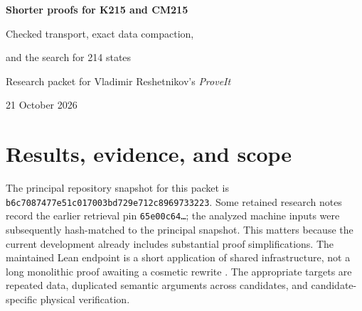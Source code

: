 \documentclass[11pt]{article}
\newcommand{\pin}{\texttt{b6c7087477e51c017003bd729e712c8969733223}}
\begin{document}
\begin{center}
{\LARGE\bfseries Shorter proofs for K215 and CM215}\par
\vspace{5pt}
{\large Checked transport, exact data compaction,\par and the search for 214 states}\par
\vspace{10pt}
Research packet for Vladimir Reshetnikov's \emph{ProveIt}\par
21 October 2026
\end{center}

\begin{abstract}
The most useful next simplification is to prove nearby machines correct by a local halting-equivalence theorem, reusing the calibrated K215 endpoint. For the existing conditional-marker alternative CM215, this packet supplies a history-free invariant, a reusable positive-stuttering theorem checked in both Lean and Coq, and an exact-table Lean proof of all-tape equihalting from the designated start control. The source invariant has only three clauses; target blocks have length one or three. Separately, exact-data pilots reduce the current Lean source-data module by 47.49\% and the Rocq offset-certificate module by 84.66\%, with kernel-checked equality audits. These are source-size reductions, not measured checking-time gains.

No 214-state machine was constructed. Completed finite-window and source-abstraction experiments are supplied with explicit bounds and negative results. A concrete next target is to reorder the CM215 selector tests, but it remains a multi-row allocation problem. The new native-machine theorem is standalone: its representation adapter to the existing ProveIt endpoint, the final composed ZFC endpoint, and full upstream rebuilds of the data pilots remain integration work.
\end{abstract}

\section{Results, evidence, and scope}

The principal repository snapshot for this packet is \pin. Some retained research notes record the earlier retrieval pin \texttt{65e00c64\ldots}; the analyzed machine inputs were subsequently hash-matched to the principal snapshot. This matters because the current development already includes substantial proof simplifications. The maintained Lean endpoint is a short application of shared infrastructure, not a long monolithic proof awaiting a cosmetic rewrite \cite{endpoint,phase3}. The appropriate targets are repeated data, duplicated semantic arguments across candidates, and candidate-specific physical verification.
\end{document}
